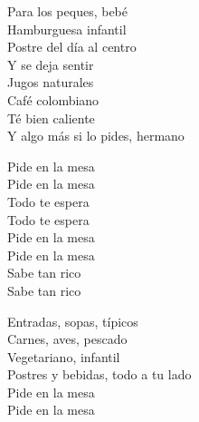 \begin{lyrics}
Para los peques, bebé\\
Hamburguesa infantil\\
Postre del día al centro\\
Y se deja sentir\\
Jugos naturales\\
Café colombiano\\
Té bien caliente\\
Y algo más si lo pides, hermano

Pide en la mesa\\
Pide en la mesa\\
Todo te espera\\
Todo te espera\\
Pide en la mesa\\
Pide en la mesa\\
Sabe tan rico\\
Sabe tan rico

Entradas, sopas, típicos\\
Carnes, aves, pescado\\
Vegetariano, infantil\\
Postres y bebidas, todo a tu lado\\
Pide en la mesa\\
Pide en la mesa
\end{lyrics}

